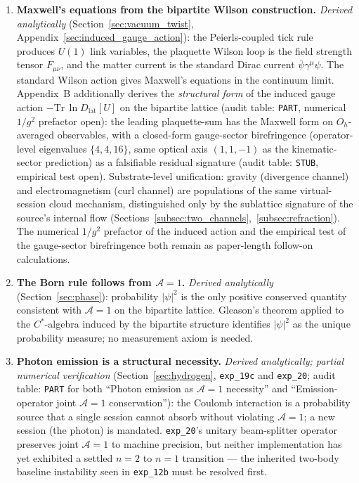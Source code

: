 \begin{enumerate}
\item \textbf{Maxwell's equations from the bipartite Wilson construction.}
\textit{Derived analytically} (Section~\ref{sec:vacuum_twist},
Appendix~\ref{sec:induced_gauge_action}):
the Peierls-coupled tick rule produces $U(1)$ link variables, the
plaquette Wilson loop is the field strength tensor $F_{\mu\nu}$, and
the matter current is the standard Dirac current
$\bar\psi\gamma^\mu\psi$.  The standard Wilson action gives Maxwell's
equations in the continuum limit.  Appendix~B additionally derives
the \emph{structural form} of the induced gauge action
$-\mathrm{Tr}\,\ln D_\text{lat}[U]$ on the bipartite lattice (audit
table: \texttt{PART}, numerical $1/g^2$ prefactor open): the leading
plaquette-sum has the Maxwell form on $O_h$-averaged observables,
with a closed-form gauge-sector birefringence (operator-level
eigenvalues $\{4, 4, 16\}$, same optical axis $(1,1,-1)$ as the
kinematic-sector prediction) as a falsifiable residual signature
(audit table: \texttt{STUB}, empirical test open).  Substrate-level
unification: gravity (divergence channel) and electromagnetism (curl
channel) are populations of the same virtual-session cloud mechanism,
distinguished only by the sublattice signature of the source's
internal flow
(Sections~\ref{subsec:two_channels},~\ref{subsec:refraction}).
The numerical $1/g^2$ prefactor of the induced action and the
empirical test of the gauge-sector birefringence both remain as
paper-length follow-on calculations.

\item \textbf{The Born rule follows from $\mathcal{A}=1$.}
\textit{Derived analytically} (Section~\ref{sec:phase}):
probability $|\psi|^2$ is the only positive conserved quantity
consistent with $\mathcal{A}=1$ on the bipartite lattice.
Gleason's theorem applied to the $C^*$-algebra induced by the
bipartite structure identifies $|\psi|^2$ as the unique probability
measure; no measurement axiom is needed.

\item \textbf{Photon emission is a structural necessity.}
\textit{Derived analytically; partial numerical verification}
(Section~\ref{sec:hydrogen}, \texttt{exp\_19c} and \texttt{exp\_20};
audit table: \texttt{PART} for both ``Photon emission as
$\mathcal{A}=1$ necessity'' and ``Emission-operator joint
$\mathcal{A}=1$ conservation''):
the Coulomb interaction is a probability source that a single session
cannot absorb without violating $\mathcal{A}=1$; a new session (the
photon) is mandated.
\texttt{exp\_20}'s unitary beam-splitter operator preserves joint
$\mathcal{A}=1$ to machine precision, but neither implementation has
yet exhibited a settled $n{=}2$ to $n{=}1$ transition --- the
inherited two-body baseline instability seen in \texttt{exp\_12b}
must be resolved first.


\end{enumerate}
